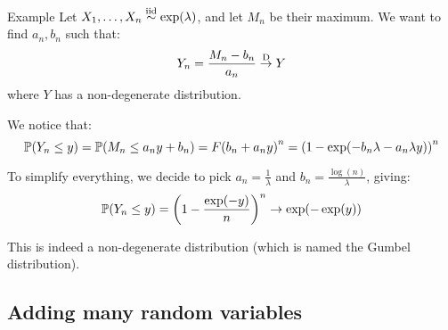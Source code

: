 \documentclass[a4paper]{article}
\begin{document}
\begin{parag}{Example}
    Let $X_1, \ldots, X_n \iid \exp\left(\lambda\right)$, and let $M_n$ be their maximum. We want to find $a_n, b_n$ such that: 
    \[Y_n = \frac{M_n - b_n}{a_n} \over{\to}{D} Y\]
    where $Y$ has a non-degenerate distribution.

    We notice that: 
    \[\prob\left(Y_n \leq y\right) = \prob\left(M_n \leq a_n y + b_n\right) = F\left(b_n + a_n y\right)^n = \left(1 - \exp\left(-b_n \lambda - a_n \lambda y\right) \right)^n\]
    
    To simplify everything, we decide to pick $a_n = \frac{1}{\lambda}$ and $b_n = \frac{\log\left(n\right)}{\lambda}$, giving: 
    \[\prob\left(Y_n \leq y\right) = \left(1 - \frac{\exp\left(-y\right)}{n}\right)^n \to \exp\left(-\exp\left(y\right)\right)\]
    
    This is indeed a non-degenerate distribution (which is named the Gumbel distribution).
\end{parag}

\subsection{Adding many random variables}
\end{document}
